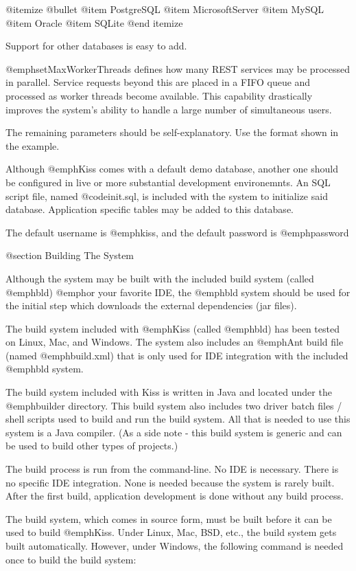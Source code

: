 @itemize @bullet
@item
PostgreSQL
@item
MicrosoftServer
@item
MySQL
@item
Oracle
@item
SQLite
@end itemize

Support for other databases is easy to add.

@emph{setMaxWorkerThreads} defines how many REST services may be
processed in parallel.  Service requests beyond this are placed in a
FIFO queue and processed as worker threads become available.  This
capability drastically improves the system's ability to handle a large
number of simultaneous users.

The remaining parameters should be self-explanatory.  Use the format
shown in the example.

Although @emph{Kiss} comes with a default demo database, another one
should be configured in live or more substantial development
environemnts.  An SQL script file, named @code{init.sql}, is included
with the system to initialize said database.  Application specific tables
may be added to this database.

The default username is @emph{kiss}, and the default password is
@emph{password}

@section Building The System

Although the system may be built with the included build system
(called @emph{bld}) @emph{or} your favorite IDE, the @emph{bld}
system should be used for the initial step which downloads the external
dependencies (jar files).

The build system included with @emph{Kiss} (called @emph{bld}) has
been tested on Linux, Mac, and Windows.  The system also includes an
@emph{Ant} build file (named @emph{build.xml}) that is only used for
IDE integration with the included @emph{bld} system.

The build system included with Kiss is written in Java and located
under the @emph{builder} directory.  This build system also includes
two driver batch files / shell scripts used to build and run the build
system.  All that is needed to use this system is a Java compiler.
(As a side note - this build system is generic and can be used to
build other types of projects.)

The build process is run from the command-line.  No IDE is necessary.
There is no specific IDE integration.  None is needed because the system
is rarely built.  After the first build, application development is done
without any build process.

The build system, which comes in source form, must be built before it
can be used to build @emph{Kiss}.  Under Linux, Mac, BSD, etc., the
build system gets built automatically.  However, under Windows, the 
following command is needed once to build the build system:

